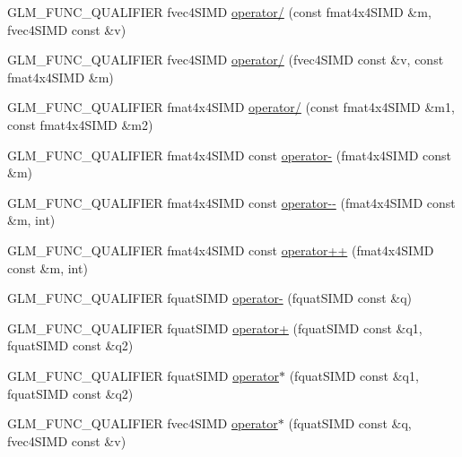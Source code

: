 \begin{DoxyCompactItemize}
\item 
G\+L\+M\+\_\+\+F\+U\+N\+C\+\_\+\+Q\+U\+A\+L\+I\+F\+I\+E\+R fvec4\+S\+I\+M\+D \hyperlink{namespaceglm_1_1detail_a9041c53e82c0b0191b24185e14e2b55f}{operator/} (const fmat4x4\+S\+I\+M\+D \&m, fvec4\+S\+I\+M\+D const \&v)
\item 
G\+L\+M\+\_\+\+F\+U\+N\+C\+\_\+\+Q\+U\+A\+L\+I\+F\+I\+E\+R fvec4\+S\+I\+M\+D \hyperlink{namespaceglm_1_1detail_a147045f9002e1195039f968a2396c435}{operator/} (fvec4\+S\+I\+M\+D const \&v, const fmat4x4\+S\+I\+M\+D \&m)
\item 
G\+L\+M\+\_\+\+F\+U\+N\+C\+\_\+\+Q\+U\+A\+L\+I\+F\+I\+E\+R fmat4x4\+S\+I\+M\+D \hyperlink{namespaceglm_1_1detail_ace681b03cfb7d72e2633dc06d4cee962}{operator/} (const fmat4x4\+S\+I\+M\+D \&m1, const fmat4x4\+S\+I\+M\+D \&m2)
\item 
G\+L\+M\+\_\+\+F\+U\+N\+C\+\_\+\+Q\+U\+A\+L\+I\+F\+I\+E\+R fmat4x4\+S\+I\+M\+D const \hyperlink{namespaceglm_1_1detail_a7f0cc16af5799679034230c9cea81b10}{operator-\/} (fmat4x4\+S\+I\+M\+D const \&m)
\item 
G\+L\+M\+\_\+\+F\+U\+N\+C\+\_\+\+Q\+U\+A\+L\+I\+F\+I\+E\+R fmat4x4\+S\+I\+M\+D const \hyperlink{namespaceglm_1_1detail_a37b1c3ee6bcd2c5e56d49e2ea90f4ee5}{operator-\/-\/} (fmat4x4\+S\+I\+M\+D const \&m, int)
\item 
G\+L\+M\+\_\+\+F\+U\+N\+C\+\_\+\+Q\+U\+A\+L\+I\+F\+I\+E\+R fmat4x4\+S\+I\+M\+D const \hyperlink{namespaceglm_1_1detail_afef703ea9bc24f3b3abbcc36e5ef65bb}{operator++} (fmat4x4\+S\+I\+M\+D const \&m, int)
\item 
G\+L\+M\+\_\+\+F\+U\+N\+C\+\_\+\+Q\+U\+A\+L\+I\+F\+I\+E\+R fquat\+S\+I\+M\+D \hyperlink{namespaceglm_1_1detail_a07dbb5e436fcb64a3c165a15c920a484}{operator-\/} (fquat\+S\+I\+M\+D const \&q)
\item 
G\+L\+M\+\_\+\+F\+U\+N\+C\+\_\+\+Q\+U\+A\+L\+I\+F\+I\+E\+R fquat\+S\+I\+M\+D \hyperlink{namespaceglm_1_1detail_a0010f5683721f2724e0e00709fc51405}{operator+} (fquat\+S\+I\+M\+D const \&q1, fquat\+S\+I\+M\+D const \&q2)
\item 
G\+L\+M\+\_\+\+F\+U\+N\+C\+\_\+\+Q\+U\+A\+L\+I\+F\+I\+E\+R fquat\+S\+I\+M\+D \hyperlink{namespaceglm_1_1detail_a6e7c8ca42117ec6c0c60b765f083557b}{operator$\ast$} (fquat\+S\+I\+M\+D const \&q1, fquat\+S\+I\+M\+D const \&q2)
\item 
G\+L\+M\+\_\+\+F\+U\+N\+C\+\_\+\+Q\+U\+A\+L\+I\+F\+I\+E\+R fvec4\+S\+I\+M\+D \hyperlink{namespaceglm_1_1detail_af198c6bb57f5b38b3fd5961b8d9b352e}{operator$\ast$} (fquat\+S\+I\+M\+D const \&q, fvec4\+S\+I\+M\+D const \&v)
\item 

\end{DoxyCompactItemize}
